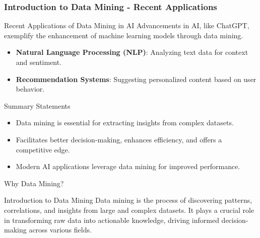 \documentclass[aspectratio=169]{beamer}
\begin{document}
\begin{frame}[fragile]
    \frametitle{Introduction to Data Mining - Recent Applications}
    \begin{block}{Recent Applications of Data Mining in AI}
        Advancements in AI, like ChatGPT, exemplify the enhancement of machine learning models through data mining.
    \end{block}

    \begin{itemize}
        \item \textbf{Natural Language Processing (NLP)}: Analyzing text data for context and sentiment.
        \item \textbf{Recommendation Systems}: Suggesting personalized content based on user behavior.
    \end{itemize}

    \begin{block}{Summary Statements}
        \begin{itemize}
            \item Data mining is essential for extracting insights from complex datasets.
            \item Facilitates better decision-making, enhances efficiency, and offers a competitive edge.
            \item Modern AI applications leverage data mining for improved performance.
        \end{itemize}
    \end{block}
\end{frame}

\begin{frame}[fragile]{Why Data Mining?}
    \begin{block}{Introduction to Data Mining}
        Data mining is the process of discovering patterns, correlations, and insights from large and complex datasets. It plays a crucial role in transforming raw data into actionable knowledge, driving informed decision-making across various fields.
    \end{block}
\end{frame}
\end{document}
